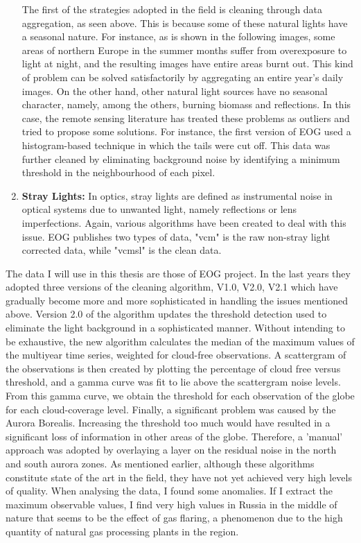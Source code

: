 \begin{enumerate}
The first of the strategies adopted in the field is cleaning through data aggregation, as seen above. This is because some of these natural lights have a seasonal nature. For instance, as is shown in the following images, some areas of northern Europe in the summer months suffer from overexposure to light at night, and the resulting images have entire areas burnt out. This kind of problem can be solved satisfactorily by aggregating an entire year's daily images.
On the other hand, other natural light sources have no seasonal character, namely, among the others, burning biomass and reflections. In this case, the remote sensing literature has treated these problems as outliers and tried to propose some solutions. For instance, the first version of EOG used a histogram-based technique in which the tails were cut off. This data was further cleaned by eliminating background noise by identifying a minimum threshold in the neighbourhood of each pixel.
\item \textbf{Stray Lights:} In optics, stray lights are defined as instrumental noise in optical systems due to unwanted light, namely reflections or lens imperfections. Again, various algorithms have been created to deal with this issue. EOG publishes two types of data, "vcm" is the raw non-stray light corrected data, while "vcmsl" is the clean data.
\end{enumerate}
The data I will use in this thesis are those of EOG project. In the last years they adopted three versions of the cleaning algorithm, V1.0, V2.0, V2.1 which have gradually become more and more sophisticated in handling the issues mentioned above.
Version 2.0 of the algorithm updates the threshold detection used to eliminate the light background in a sophisticated manner. Without intending to be exhaustive, the new algorithm calculates the median of the maximum values of the multiyear time series, weighted for cloud-free observations. A scattergram of the observations is then created by plotting the percentage of cloud free versus threshold, and a gamma curve was fit to lie above the scattergram noise levels. From this gamma curve, we obtain the threshold for each observation of the globe for each cloud-coverage level.
Finally, a significant problem was caused by the Aurora Borealis. Increasing the threshold too much would have resulted in a significant loss of information in other areas of the globe. Therefore, a 'manual' approach was adopted by overlaying a layer on the residual noise in the north and south aurora zones.
As mentioned earlier, although these algorithms constitute state of the art in the field, they have not yet achieved very high levels of quality. When analysing the data, I found some anomalies. If I extract the maximum observable values, I find very high values in Russia in the middle of nature that seems to be the effect of gas flaring, a phenomenon due to the high quantity of natural gas processing plants in the region.
